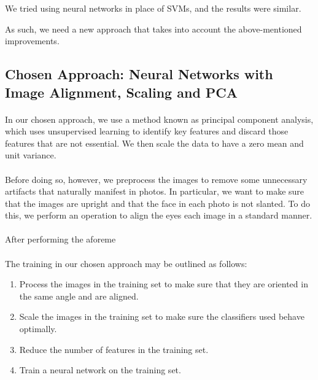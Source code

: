 \documentclass{article}
\begin{document}
We tried using neural networks in place of SVMs, and the results were similar.

As such, we need a new approach that takes into account the above-mentioned improvements.
\newpage

\subsection{Chosen Approach: Neural Networks with Image Alignment, Scaling and PCA}
\label{sec:3.2}
\paragraph{}
In our chosen approach, we use a method known as principal component analysis, which uses unsupervised learning to identify key features and discard those features that are not essential. We then scale the data to have a zero mean and unit variance.

\paragraph{}
Before doing so, however, we preprocess the images to remove some unnecessary artifacts that naturally manifest in photos. In particular, we want to make sure that the images are upright and that the face in each photo is not slanted. To do this, we perform an operation to align the eyes each image in a standard manner.

\paragraph{}
After performing the aforeme

\paragraph{}
The training in our chosen approach may be outlined as follows:
\begin{enumerate}
	\item Process the images in the training set to make sure that they are oriented in the same angle and are aligned.
	\item Scale the images in the training set to make sure the classifiers used behave optimally.
	\item Reduce the number of features in the training set.
	\item Train a neural network on the training set.
\end{enumerate}
\newpage
\end{document}
